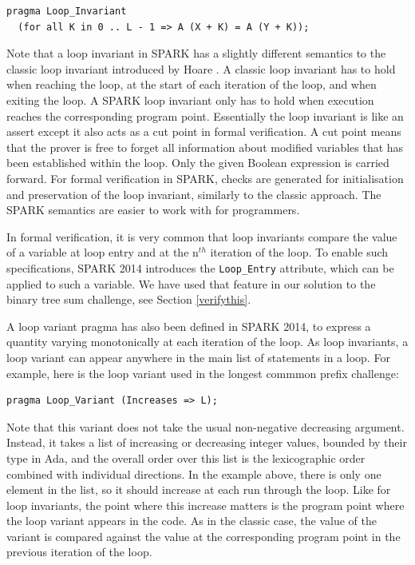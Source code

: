 \documentclass[sttt,final]{svjour}
\begin{document}
\begin{lstlisting}
pragma Loop_Invariant
  (for all K in 0 .. L - 1 => A (X + K) = A (Y + K));
\end{lstlisting}

Note that a loop invariant in SPARK has a slightly different semantics
to the classic loop invariant introduced by Hoare
\cite{hoare69cacm}. A classic loop invariant has to hold when reaching
the loop, at the start of each iteration of the loop, and when exiting
the loop. A SPARK loop invariant only has to hold when execution
reaches the corresponding program point. Essentially the loop
invariant is like an assert except it also acts as a cut point in
formal verification. A cut point means that the prover is free to
forget all information about modified variables that has been
established within the loop. Only the given Boolean expression is
carried forward. For formal verification in SPARK, checks are
generated for initialisation and preservation of the loop invariant,
similarly to the classic approach. The SPARK semantics are easier to
work with for programmers.

In formal verification, it is very common that loop invariants compare
the value of a variable at loop entry and at the n$^{th}$ iteration of
the loop. To enable such specifications, SPARK 2014 introduces the
\verb|Loop_Entry| attribute, which can be applied to such a
variable. We have used that feature in our solution to the binary tree sum
challenge, see Section \ref{verifythis}.

A loop variant pragma has also been defined in SPARK 2014, to express
a quantity varying monotonically at each iteration of the loop. As
loop invariants, a loop variant can appear anywhere in the main list
of statements in a loop. For example, here is the loop variant used in
the longest commmon prefix challenge:

\begin{lstlisting}
pragma Loop_Variant (Increases => L);
\end{lstlisting}

Note that this variant does not take the usual non-negative decreasing
argument. Instead, it takes a list of increasing or decreasing integer
values, bounded by their type in Ada, and the overall order over this
list is the lexicographic order combined with individual
directions. In the example above, there is only one element in the
list, so it should increase at each run through the loop. Like for
loop invariants, the point where this increase matters is the program
point where the loop variant appears in the code. As in the classic
case, the value of the variant is compared against the value at the
corresponding program point in the previous iteration of the loop.
\end{document}
